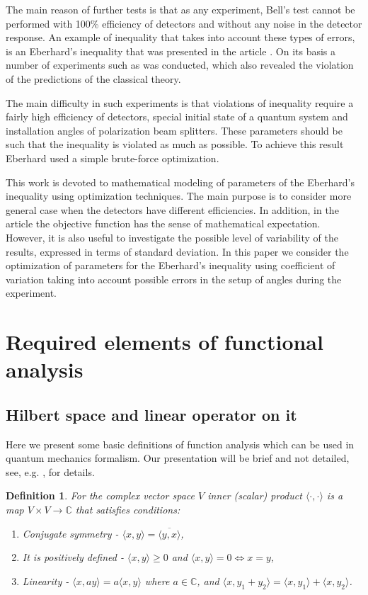 \documentclass[11pt]{article}
\newtheorem{definition}{Definition}[section]
\begin{document}
The main reason of further tests is that as any experiment, Bell's test cannot be performed with 100\% efficiency of detectors and without any noise in the detector response. An example of inequality that takes into account these types of errors, is an Eberhard's inequality that was presented in the article \cite{Eberhard}. On its basis a number of experiments such as \cite{Zeilinger} was conducted, which also revealed the violation of the predictions of the classical theory.

The main difficulty in such experiments is that violations of inequality require a fairly high efficiency of detectors, special initial state of a quantum system and installation angles of polarization beam splitters. These parameters should be such that the inequality is violated as much as possible. To achieve this result Eberhard used a simple brute-force optimization.

This work is devoted to mathematical modeling of parameters of the Eberhard's inequality using optimization techniques. The main purpose is to consider more general case when the detectors have different efficiencies. In addition, in the article \cite{Eberhard} the objective function has the sense of mathematical expectation. However, it is also useful to investigate the possible level of variability of the results, expressed in terms of standard deviation. In this paper we consider the optimization of parameters for the Eberhard's inequality using coefficient of variation taking into account possible errors in the setup of angles during the experiment.


\section{Required elements of functional analysis}
\subsection{Hilbert space and linear operator on it}
Here we present some basic definitions of function analysis which can be used in quantum mechanics formalism. Our presentation will be brief and not detailed, see, e.g. \cite{advanced_la}, for details.

\begin{definition}
For the complex vector space $V$ inner (scalar) product $\langle\cdot,\cdot\rangle$ is a map $V\times V \to \mathbb{C}$ that satisfies conditions:
\begin{enumerate}
\item Conjugate symmetry - $\langle x, y\rangle = \overline{\langle y, x\rangle}$,
\item It is positively defined - $\langle x, y\rangle \geq 0$ and $\langle x, y\rangle = 0 \Leftrightarrow x = y$,
\item Linearity - $\langle x, ay\rangle = a\langle x, y\rangle$ where $a\in\mathbb{C}$, and $\langle x, y_1 + y_2\rangle = \langle x, y_1\rangle + \langle x, y_2\rangle$.
\end{enumerate}
\end{definition}
\end{document}
